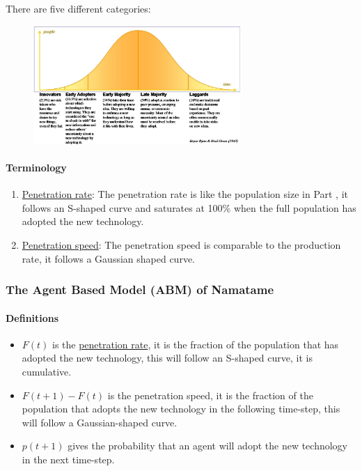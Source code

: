 There are five different categories:

\begin{figure}[h]
    \centering
    \includegraphics[width=0.7\textwidth]{Pictures/Categories_of_adoption.png}
\end{figure}

\paragraph{Terminology}

\begin{enumerate}[]
    \item \underline{Penetration rate}: The penetration rate is like the
        population size in Part , it follows an S-shaped curve
        and saturates at 100\% when the full population has adopted the new
        technology.
    \item \underline{Penetration speed}: The penetration speed is comparable
        to the production rate, it follows a Gaussian shaped curve.
\end{enumerate}

\subsubsection{The Agent Based Model (ABM) of Namatame}

\paragraph{Definitions}

\begin{itemize}
    \item $F(t)$ is the \underline{penetration rate}, it is the fraction
        of the population that has adopted the new technology, this will
        follow an S-shaped curve, it is cumulative.
    \item $F(t+1) - F(t)$ is the penetration speed, it is the fraction
        of the population that adopts the new technology in the following
        time-step, this will follow a Gaussian-shaped curve.
    \item $p(t+1)$ gives the probability that an agent will adopt the new
        technology in the next time-step.
\end{itemize}


